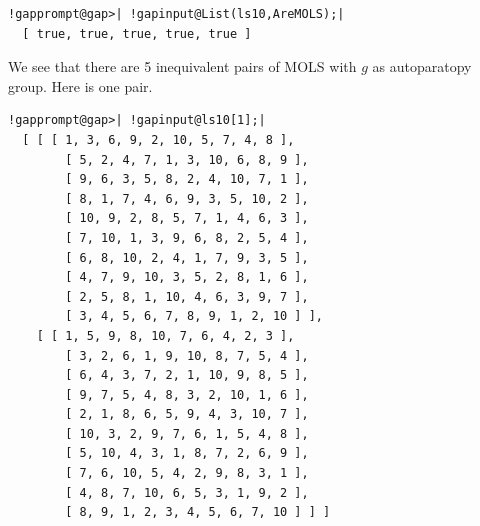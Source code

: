 \documentclass[a4paper,11pt]{report}
\begin{document}
{{\begin{Verbatim}[commandchars=!@|,fontsize=\small,frame=single,label=Example]
  !gapprompt@gap>| !gapinput@List(ls10,AreMOLS);|
  [ true, true, true, true, true ]
\end{Verbatim}
 We see that there are 5 inequivalent pairs of MOLS with $g$ as autoparatopy group. Here is one pair. 
\begin{Verbatim}[commandchars=!@|,fontsize=\small,frame=single,label=Example]
  !gapprompt@gap>| !gapinput@ls10[1];|
  [ [ [ 1, 3, 6, 9, 2, 10, 5, 7, 4, 8 ], 
        [ 5, 2, 4, 7, 1, 3, 10, 6, 8, 9 ], 
        [ 9, 6, 3, 5, 8, 2, 4, 10, 7, 1 ], 
        [ 8, 1, 7, 4, 6, 9, 3, 5, 10, 2 ], 
        [ 10, 9, 2, 8, 5, 7, 1, 4, 6, 3 ], 
        [ 7, 10, 1, 3, 9, 6, 8, 2, 5, 4 ], 
        [ 6, 8, 10, 2, 4, 1, 7, 9, 3, 5 ], 
        [ 4, 7, 9, 10, 3, 5, 2, 8, 1, 6 ], 
        [ 2, 5, 8, 1, 10, 4, 6, 3, 9, 7 ], 
        [ 3, 4, 5, 6, 7, 8, 9, 1, 2, 10 ] ], 
    [ [ 1, 5, 9, 8, 10, 7, 6, 4, 2, 3 ], 
        [ 3, 2, 6, 1, 9, 10, 8, 7, 5, 4 ], 
        [ 6, 4, 3, 7, 2, 1, 10, 9, 8, 5 ], 
        [ 9, 7, 5, 4, 8, 3, 2, 10, 1, 6 ], 
        [ 2, 1, 8, 6, 5, 9, 4, 3, 10, 7 ], 
        [ 10, 3, 2, 9, 7, 6, 1, 5, 4, 8 ], 
        [ 5, 10, 4, 3, 1, 8, 7, 2, 6, 9 ], 
        [ 7, 6, 10, 5, 4, 2, 9, 8, 3, 1 ], 
        [ 4, 8, 7, 10, 6, 5, 3, 1, 9, 2 ], 
        [ 8, 9, 1, 2, 3, 4, 5, 6, 7, 10 ] ] ]
\end{Verbatim}
 }

 
}
\end{document}
